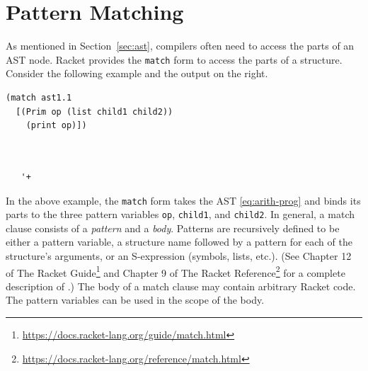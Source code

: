 \documentclass[11pt]{book}
\begin{document}
\section{Pattern Matching}
\label{sec:pattern-matching}

As mentioned in Section~\ref{sec:ast}, compilers often need to access
the parts of an AST node. Racket provides the \texttt{match} form to
access the parts of a structure. Consider the following example and
the output on the right.  
\begin{center}
\begin{minipage}{0.5\textwidth}
\begin{lstlisting}
(match ast1.1
  [(Prim op (list child1 child2))
    (print op)])
\end{lstlisting}
\end{minipage}
\vrule
\begin{minipage}{0.25\textwidth}
\begin{lstlisting}


   '+
\end{lstlisting}
\end{minipage}
\end{center}
In the above example, the \texttt{match} form takes the AST
\eqref{eq:arith-prog} and binds its parts to the three pattern
variables \texttt{op}, \texttt{child1}, and \texttt{child2}. In
general, a match clause consists of a \emph{pattern} and a
\emph{body}.
Patterns are recursively defined to be either a pattern
variable, a structure name followed by a pattern for each of the
structure's arguments, or an S-expression (symbols, lists, etc.).
(See Chapter 12 of The Racket
Guide\footnote{\url{https://docs.racket-lang.org/guide/match.html}}
and Chapter 9 of The Racket
Reference\footnote{\url{https://docs.racket-lang.org/reference/match.html}}
for a complete description of .)
%
The body of a match clause may contain arbitrary Racket code.  The
pattern variables can be used in the scope of the body.
\end{document}
